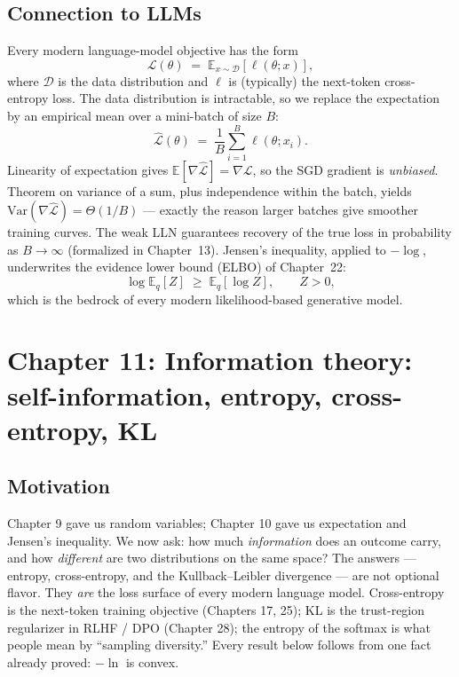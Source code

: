 \documentclass[11pt]{article}
\theoremstyle{remark}
\begin{document}
\subsection*{Connection to LLMs}

Every modern language-model objective has the form
\[
\mathcal{L}(\theta) \;=\; \mathbb{E}_{x\sim\mathcal{D}}[\ell(\theta;x)],
\]
where $\mathcal{D}$ is the data distribution and $\ell$ is (typically) the next-token cross-entropy loss. The data distribution is intractable, so we replace the expectation by an empirical mean over a mini-batch of size $B$:
\[
\hat{\mathcal{L}}(\theta) \;=\; \frac{1}{B}\sum_{i=1}^B \ell(\theta; x_i).
\]
Linearity of expectation gives $\mathbb{E}[\nabla\hat{\mathcal{L}}] = \nabla\mathcal{L}$, so the SGD gradient is \emph{unbiased}. Theorem on variance of a sum, plus independence within the batch, yields $\mathrm{Var}(\nabla\hat{\mathcal{L}}) = \Theta(1/B)$ — exactly the reason larger batches give smoother training curves. The weak LLN guarantees recovery of the true loss in probability as $B\to\infty$ (formalized in Chapter~13). Jensen's inequality, applied to $-\log$, underwrites the evidence lower bound (ELBO) of Chapter~22:
\[
\log \mathbb{E}_{q}[Z] \;\ge\; \mathbb{E}_q[\log Z], \qquad Z > 0,
\]
which is the bedrock of every modern likelihood-based generative model.


\section*{Chapter 11: Information theory: self-information, entropy, cross-entropy, KL}

\subsection*{Motivation}

Chapter 9 gave us random variables; Chapter 10 gave us expectation and Jensen's inequality. We now ask: how much \emph{information} does an outcome carry, and how \emph{different} are two distributions on the same space? The answers --- entropy, cross-entropy, and the Kullback--Leibler divergence --- are not optional flavor. They \emph{are} the loss surface of every modern language model. Cross-entropy is the next-token training objective (Chapters 17, 25); KL is the trust-region regularizer in RLHF / DPO (Chapter 28); the entropy of the softmax is what people mean by ``sampling diversity.'' Every result below follows from one fact already proved: $-\ln$ is convex.
\end{document}
